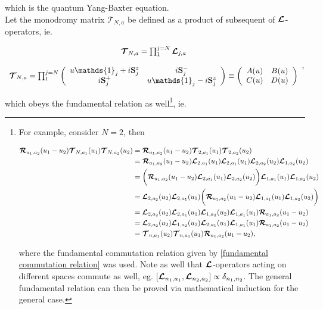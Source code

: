 \documentclass{homework}
\begin{document}
which is the quantum Yang-Baxter equation. \\

Let the monodromy matrix $\bm{\mathcal{T}}_{N,a}$ be defined as a product of subsequent of $\bm{\mathcal{L}}$-operators, ie.

\begin{equation}
    \begin{array}{c}
         \bmt_{N,a} = \prod^{j=N}_{1} \bl_{j,a} \\
         \\
         \bmt_{N,a} = \prod^{j=N}_{1} \left(\begin{array}{cc}
            u \mathds{1}_j + i \spin_j^z & i \spin_j^-  \\
            i \spin_j^+ & u \mathds{1}_j - i \spin_j^z
         \end{array}\right) \equiv \left(\begin{array}{cc}
            A(u) & B(u) \\
            C(u) & D(u)
         \end{array}\right) 
    \end{array},
\end{equation}

which obeys the fundamental relation as well\footnote{ For example, consider $N=2$, then

\begin{equation}
    \begin{split}
        {\bm {\mathcal{R}}_{a_1, a_2}(u_1-u_2) \bm{\mathcal{T}}_{N, a_1} (u_1) \bm{\mathcal{T}}_{N, a_2} (u_2)} &= {\bm {\mathcal{R}}_{a_1, a_2}(u_1-u_2) \bm{\mathcal{T}}_{2, a_1} (u_1) \bm{\mathcal{T}}_{2, a_2} (u_2)} \\
        &= {\bm {\mathcal{R}}_{a_1, a_2}(u_1-u_2) \bm{\mathcal{L}}_{2, a_1} (u_1) \bm{\mathcal{L}}_{2, a_1} (u_1) \bm{\mathcal{L}}_{2, a_2} (u_2) \bm{\mathcal{L}}_{1, a_2} (u_2)} \\
        &= \bigg(\bm {\mathcal{R}}_{a_1, a_2}(u_1-u_2) \bm{\mathcal{L}}_{2, a_1} (u_1) \bm{\mathcal{L}}_{2, a_2} (u_2)\bigg) \bm{\mathcal{L}}_{1, a_1} (u_1) \bm{\mathcal{L}}_{1, a_2} (u_2) \\
        &=  \bm{\mathcal{L}}_{2, a_2} (u_2) \bm{\mathcal{L}}_{2, a_1} (u_1) \bigg(\bm {\mathcal{R}}_{a_1, a_2}(u_1-u_2)\bm{\mathcal{L}}_{1, a_1} (u_1) \bm{\mathcal{L}}_{1, a_2} (u_2) \bigg) \\
        &= \bm{\mathcal{L}}_{2, a_2} (u_2) \bm{\mathcal{L}}_{2, a_1} (u_1) \bm{\mathcal{L}}_{1, a_2} (u_2) \bm{\mathcal{L}}_{1, a_1} (u_1) \bm {\mathcal{R}}_{a_1, a_2}(u_1-u_2) \\
        &=  \bm{\mathcal{L}}_{2, a_2} (u_2) \bm{\mathcal{L}}_{1, a_2} (u_2) \bm{\mathcal{L}}_{2, a_1} (u_1) \bm{\mathcal{L}}_{1, a_1} (u_1) \bm {\mathcal{R}}_{a_1, a_2}(u_1-u_2) \\
        &= \bm{\mathcal{T}}_{n, a_1} (u_2) \bm{\mathcal{T}}_{n, a_1} (u_1) \bm{\mathcal{R}}_{a_1, a_2}(u_1-u_2),
    \end{split}
\end{equation}

where the fundamental commutation relation given by \eqref{fundamental commutation relation} was used. Note as well that $\bm{\mathcal{L}}$-operators acting on different spaces commute as well, eg. $[\bm{\mathcal{L}}_{n_1, a_1}, \bm{\mathcal{L}}_{n_2, a_2}] \propto \delta_{n_1, n_2}$. The general fundamental relation can then be proved via mathematical induction for the general case.}, ie.
\end{document}

